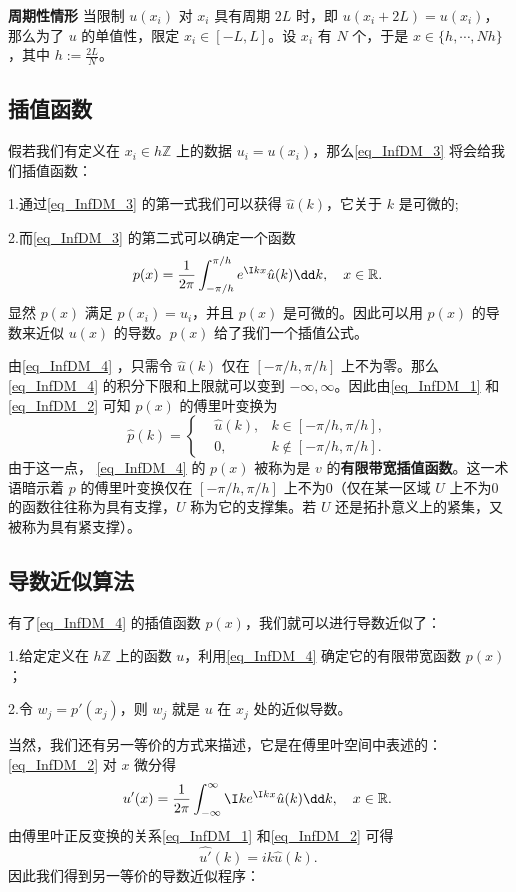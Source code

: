 \textbf{周期性情形}
当限制 $u(x_i)$ 对 $x_i$ 具有周期 $2L$ 时，即 $u(x_i+2L)=u(x_i)$，那么为了 $u$ 的单值性，限定 $x_i\in[-L,L]$。设 $x_i$ 有 $N$ 个，于是 $x\in \{h,\cdots,Nh\}$，其中 $h:=\frac{2L}{N}$。

\subsection{插值函数}
假若我们有定义在 $x_i\in h\mathbb Z$ 上的数据 $u_i=u(x_i)$，那么\autoref{eq_InfDM_3} 将会给我们插值函数：

1.通过\autoref{eq_InfDM_3} 的第一式我们可以获得 $\hat u(k)$，它关于 $k$ 是可微的;

2.而\autoref{eq_InfDM_3} 的第二式可以确定一个函数 
\begin{equation}\label{eq_InfDM_4}
p(x)=\frac{1}{2\pi}\int_{-\pi/h}^{\pi/h} e^{\I kx}\hat u(k)\dd k,\quad x\in \mathbb R.~
\end{equation}
显然 $p(x)$ 满足 $p(x_i)=u_i$，并且 $p(x)$ 是可微的。因此可以用 $p(x)$ 的导数来近似 $u(x)$ 的导数。$p(x)$ 给了我们一个插值公式。

由\autoref{eq_InfDM_4} ，只需令 $\hat u(k)$ 仅在 $[-\pi/h,\pi/h]$ 上不为零。那么\autoref{eq_InfDM_4} 的积分下限和上限就可以变到 $-\infty,\infty$。因此由\autoref{eq_InfDM_1} 和\autoref{eq_InfDM_2} 可知 $p(x)$ 的傅里叶变换为
\begin{equation}
\hat p(k)=\left\{\begin{aligned}
&\hat u(k),&k\in[-\pi/h,\pi/h],\\
&0,&k\not\in[-\pi/h,\pi/h].
\end{aligned}\right.~
\end{equation}
由于这一点， \autoref{eq_InfDM_4} 的  $p(x)$ 被称为是 $v$ 的\textbf{有限带宽插值函数}。这一术语暗示着 $p$ 的傅里叶变换仅在 $[-\pi/h,\pi/h]$ 上不为0（仅在某一区域 $U$ 上不为0的函数往往称为具有支撑，$U$ 称为它的支撑集。若 $U$ 还是拓扑意义上的紧集，又被称为具有紧支撑）。

\subsection{导数近似算法}
有了\autoref{eq_InfDM_4} 的插值函数 $p(x)$，我们就可以进行导数近似了：

1.给定定义在 $h\mathbb Z$ 上的函数 $u$，利用\autoref{eq_InfDM_4} 确定它的有限带宽函数 $p(x)$；

2.令 $w_j=p'(x_j)$，则 $w_j$ 就是 $u$ 在 $x_j$ 处的近似导数。

当然，我们还有另一等价的方式来描述，它是在傅里叶空间中表述的：\autoref{eq_InfDM_2}  对 $x$ 微分得
\begin{equation}
u'(x)=\frac{1}{2\pi}\int_{-\infty}^{\infty} \I ke^{\I kx}\hat u(k)\dd k,\quad x\in \mathbb R.~
\end{equation}
由傅里叶正反变换的关系\autoref{eq_InfDM_1} 和\autoref{eq_InfDM_2} 可得
\begin{equation}
\hat{u'}(k)=ik\hat u(k).~
\end{equation}
因此我们得到另一等价的导数近似程序：

